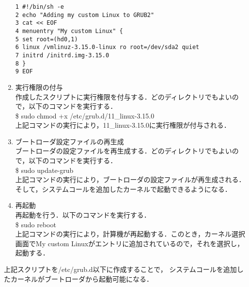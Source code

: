 \documentclass[12pt]{jsarticle}
\begin{document}
\begin{enumerate}
\begin{verbatim}
1 #!/bin/sh -e
2 echo "Adding my custom Linux to GRUB2"
3 cat << EOF
4 menuentry "My custom Linux" {
5 set root=(hd0,1)
6 linux /vmlinuz-3.15.0-linux ro root=/dev/sda2 quiet
7 initrd /initrd.img-3.15.0
8 }
9 EOF
\end{verbatim}
%
\item 実行権限の付与\\
  作成したスクリプトに実行権限を付与する．どのディレクトリでもよいので，以下のコマンドを実行する．\\
  \$ sudo chmod +x /etc/grub.d/11\_linux-3.15.0\\
  上記コマンドの実行により，11\_linux-3.15.0に実行権限が付与される．\\
\item ブートローダ設定ファイルの再生成\\
  ブートローダの設定ファイルを再生成する．どのディレクトリでもよいので，以下のコマンドを実行する．\\
  \$ sudo update-grub\\
  上記コマンドの実行により，ブートローダの設定ファイルが再生成される．そして，システムコールを追加したカーネルで起動できるようになる．\\
\item 再起動\\
  再起動を行う．以下のコマンドを実行する．\\
  \$ sudo reboot \\
  上記コマンドの実行により，計算機が再起動する．このとき，カーネル選択画面でMy custom Linuxがエントリに追加されているので，それを選択し，起動する．
\end{enumerate}


上記スクリプトを/etc/grub.d以下に作成することで，
システムコールを追加したカーネルがブートローダから起動可能になる．
\end{document}
